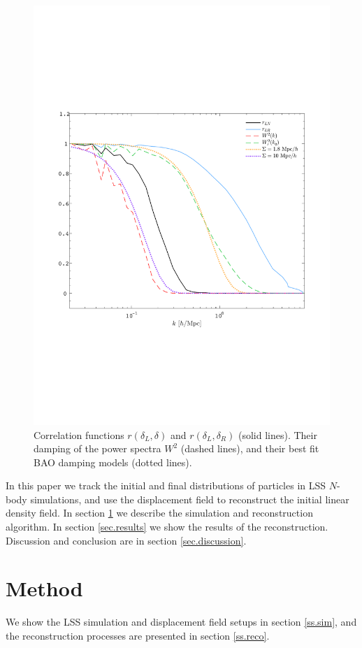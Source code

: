 \documentclass[aps,prd,twocolumn,superscriptaddress,amsfont,amssymb,amsmath,nofootinbib,showpacs,balancelastpage]{revtex4-1}
\begin{document}
\begin{figure}[t] \centering
  \includegraphics[width=1.0\linewidth]{fig2.pdf}
  \caption{Correlation functions $r(\delta_L,\delta)$ and $r(\delta_L,\delta_R)$
  (solid lines). Their
  damping of the power spectra $W^2$ (dashed lines),
  and their best fit BAO damping models (dotted lines).}
  \label{fig.2}
\end{figure}

In this paper we track the initial and final distributions of particles in LSS $N$-
body simulations, and use the displacement field to reconstruct the initial linear 
density field. In section 
\ref{sec.method} we describe the simulation and reconstruction algorithm. In 
section \ref{sec.results} we show the results of the reconstruction. Discussion and 
conclusion are in section \ref{sec.discussion}.

\section{Method}\label{sec.method}
We show the LSS simulation and displacement field setups in section \ref{ss.sim},
and the reconstruction processes are presented in section \ref{ss.reco}.
\end{document}
